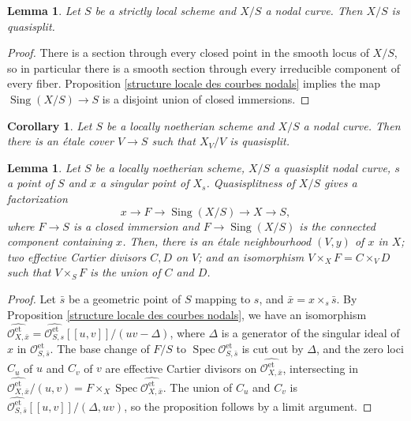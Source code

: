\documentclass[a4paper,10pt,twoside]{article}
\newcommand{\ra}{\rightarrow}
\newcommand{\on}[1]{\operatorname{#1}}
\renewcommand{\O}{\mathcal{O}}
\DeclareMathOperator{\spec}{Spec}
\DeclareMathOperator{\sing}{Sing}
\newtheorem{lem}[thm]{Lemma}
\newtheorem{cor}[thm]{Corollary}
\theoremstyle{definition}
\theoremstyle{remark}
\renewcommand{\on}[1]{\operatorname{#1}}
\begin{document}
\begin{lem}\label{lemma:quasisplit_if_base_strictly_local}
Let $S$ be a strictly local scheme and $X/S$ a nodal curve. Then $X/S$ is quasisplit.
\end{lem}

\begin{proof}
There is a section through every closed point in the smooth locus of $X/S$, so in particular there is a smooth section through every irreducible component of every fiber. Proposition \ref{structure locale des courbes nodals} implies the map $\sing(X/S)\ra S$ is a disjoint union of closed immersions.
\end{proof}

\begin{cor}\label{corollary:curves_are_QS_over_some_etale_cover}
Let $S$ be a locally noetherian scheme and $X/S$ a nodal curve. Then there is an \'etale cover $V \to S$ such that $X_V/V$ is quasisplit.
\end{cor}



\begin{lem}\label{lemma:branches_at_a_singularity_are_Cartier_disjoint}
Let $S$ be a locally noetherian scheme, $X/S$ a quasisplit nodal curve, $s$ a point of $S$ and $x$ a singular point of $X_s$. Quasisplitness of $X/S$ gives a factorization
\[
x \to F \to \sing(X/S) \to X \to S,
\]
where $F \to S$ is a closed immersion and $F \to \sing(X/S)$ is the connected component containing $x$. Then, there is an \'etale neighbourhood $(V,y)$ of $x$ in $X$; two effective Cartier divisors $C,D$ on $V$; and an isomorphism $V \times_X F = C \times_V D$ such that $V \times_S F$ is the union of $C$ and $D$.
\end{lem}

\begin{proof}
Let $\bar s$ be a geometric point of $S$ mapping to $s$, and $\bar x=x\times_s \bar s$. By Proposition \ref{structure locale des courbes nodals}, we have an isomorphism $\widehat{\O_{X,\bar x}^{\on{et}}}=\widehat{\O_{S,s}^{\on{et}}}[[u,v]]/(uv-\Delta)$, where $\Delta$ is a generator of the singular ideal of $x$ in $\O_{S,\bar s}^{\on{et}}$. The base change of $F/S$ to $\spec\O_{S,\bar s}^{\on{et}}$ is cut out by $\Delta$, and the zero loci $C_u$ of $u$ and $C_v$ of $v$ are effective Cartier divisors on $\widehat{\O_{X,\bar x}^{\on{et}}}$, intersecting in $\widehat{\O_{X,\bar x}^{\on{et}}}/(u,v) = F\times_X \spec \widehat{\O_{X,\bar x}^{\on{et}}}$. The union of $C_u$ and $C_v$ is $\widehat{\O_{S,\bar s}^{\on{et}}}[[u,v]]/(\Delta, uv)$, so the proposition follows by a limit argument.
\end{proof}
\end{document}
